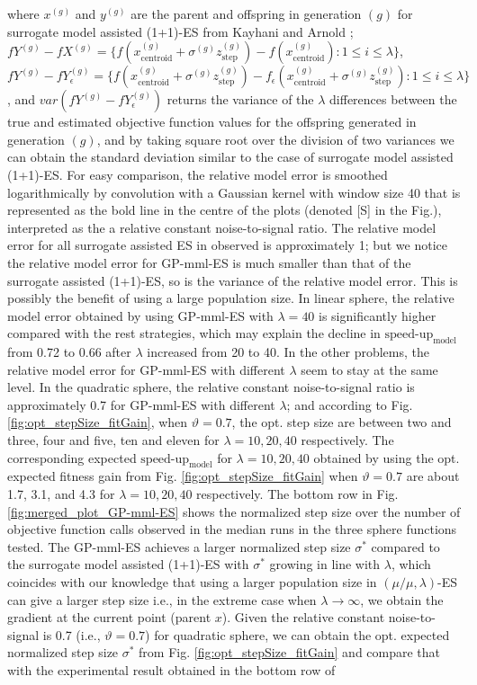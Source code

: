 where $x^{(g)}$ and $y^{(g)}$ are the parent and offspring in generation $(g)$ for surrogate model assisted (1+1)-ES from Kayhani and Arnold \cite{DBLP:conf/ppsn/KayhaniA18}; $fY^{(g)}- fX^{(g)}= \{ f(x_{\text{centroid}}^{(g)} + \sigma^{(g)} z_{\text{step}}^{(g)}) - f(x_{\text{centroid}}^{(g)}): 1 \leq i \leq \lambda \}$, $fY^{(g)}- fY_{\epsilon}^{(g)} = \{ f(x_{\text{centroid}}^{(g)} + \sigma^{(g)} z_{\text{step}}^{(g)}) - f_\epsilon (x_{\text{centroid}}^{(g)} + \sigma^{(g)} z_{\text{step}}^{(g)}) : 1 \leq i \leq \lambda \}$, and $var(fY^{(g)}- fY_{\epsilon}^{(g)})$ returns the variance of the $\lambda$ differences between the true and estimated objective function values for the offspring generated in generation $(g)$, and by taking square root over the division of two variances we can obtain the standard deviation similar to the case of surrogate model assisted (1+1)-ES. For easy comparison, the relative model error is smoothed logarithmically by convolution with a Gaussian kernel with window size 40 that is represented as the bold line in the centre of the plots (denoted [S] in the Fig.), interpreted as the a relative constant noise-to-signal ratio. The relative model error for all surrogate assisted ES in observed is approximately 1; but we notice the relative model error for GP-mml-ES is much smaller than that of the surrogate assisted (1+1)-ES, so is the variance of the relative model error. This is possibly the benefit of using a large population size. In linear sphere, the relative model error obtained by using GP-mml-ES with $\lambda=40$ is significantly higher compared with the rest strategies, which may explain the decline in $\text{speed-up}_{\text{model}}$ from 0.72 to 0.66 after $\lambda$ increased from 20 to 40. In the other problems, the relative model error for GP-mml-ES with different $\lambda$ seem to stay at the same level. In the quadratic sphere, the relative constant noise-to-signal ratio is approximately 0.7 for GP-mml-ES with different $\lambda$; and according to Fig. \ref{fig:opt_stepSize_fitGain}, when $\vartheta=0.7$, the opt. step size are between two and three, four and five, ten and eleven for $\lambda=10,20,40$ respectively. The corresponding expected $\text{speed-up}_{\text{model}}$ for $\lambda=10,20,40$ obtained by using the opt. expected fitness gain from Fig. \ref{fig:opt_stepSize_fitGain} when $\vartheta=0.7$ are about 1.7, 3.1, and 4.3 for $\lambda=10,20,40$ respectively. The bottom row in Fig. \ref{fig:merged_plot_GP-mml-ES} shows the normalized step size over the number of objective function calls observed in the median runs in the three sphere functions tested. The GP-mml-ES achieves a larger normalized step size $\sigma^*$ compared to the surrogate model assisted (1+1)-ES with $\sigma^*$ growing in line with $\lambda$, which coincides with our knowledge that using a larger population size in $(\mu/\mu,\lambda)$-ES can give a larger step size i.e., in the extreme case when $\lambda \rightarrow \infty $, we obtain the gradient at the current point (parent $x$). Given the relative constant noise-to-signal is 0.7 (i.e., $\vartheta=0.7$) for quadratic sphere, we can obtain the opt. expected normalized step size $\sigma^*$ from Fig. \ref{fig:opt_stepSize_fitGain} and compare that with the experimental result obtained in the bottom row of 